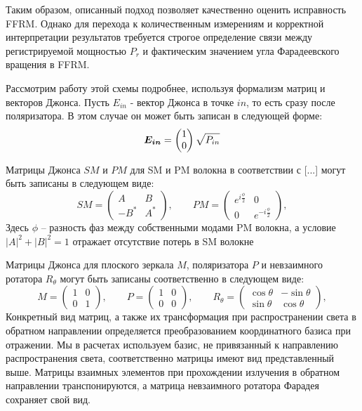 \documentclass{article}
\begin{document}
Таким образом, описанный подход позволяет качественно оценить исправность FFRM. Однако для перехода к количественным измерениям и корректной интерпретации результатов требуется строгое определение связи между регистрируемой мощностью $P_{r}$ и фактическим значением угла Фарадеевского вращения в FFRM.  


Рассмотрим работу этой схемы  подробнее, используя формализм матриц и векторов Джонса.
Пусть $E_{in}$ - вектор Джонса в точке $in$, то есть сразу после поляризатора. В этом случае он может быть записан в следующей форме:
\begin{equation}
	\bm{E_{in}} = \begin{pmatrix} 1 \\ 0 \end{pmatrix}\sqrt{P_{in}} \\
\end{equation}

Матрицы Джонса $SM$ и $PM$ для SM и PM волокна в соответствии с [...] могут быть записаны в следующем виде:
\begin{equation}
	SM = 
	\begin{pmatrix}
		A & B \\
		-B^* & A^*
	\end{pmatrix},\qquad 
	PM = 
	\begin{pmatrix}
		e^{i\frac{\phi}{2}} & 0 \\
		0 & e^{-i\frac{\phi}{2}}
	\end{pmatrix},	
\end{equation}
Здесь $\phi$ – разность фаз между собственными модами PM волокна, а условие $|A|^2 + |B|^2 = 1$ отражает отсутствие потерь в SM волокне

Матрицы Джонса для плоского зеркала $M$, поляризатора  $P$ и невзаимного ротатора $R_\theta$ могут быть записаны соответственно в следующем виде:
\begin{equation}
	M = 
	\begin{pmatrix}
		1 & 0 \\
		0 & 1
	\end{pmatrix},\qquad 		
	P = 
	\begin{pmatrix}
		1 & 0 \\
		0 & 0
	\end{pmatrix},\qquad 
	R_\theta = 
	\begin{pmatrix}
		\cos\theta & -\sin\theta \\
		\sin\theta & \cos\theta
	\end{pmatrix},		
\end{equation}
Конкретный вид матриц, а также их трансформация при распространении света в обратном направлении определяется преобразованием координатного базиса при отражении. Мы в расчетах используем базис, не привязанный к направлению распространения света, соответственно матрицы имеют вид представленный выше. Матрицы взаимных элементов при прохождении излучения в обратном направлении транспонируются, а матрица невзаимного ротатора Фарадея сохраняет свой вид.
\end{document}
